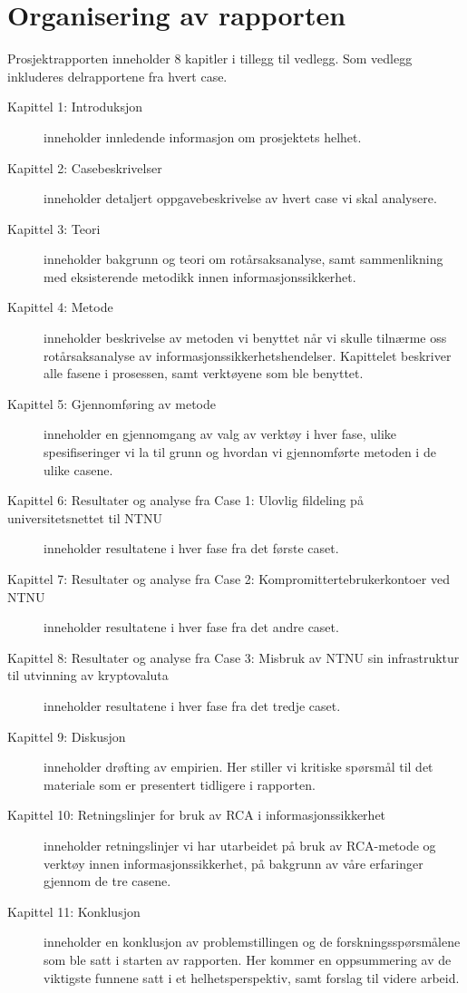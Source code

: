 \section{Organisering av rapporten}
\label{sec:organisering_rapport}
Prosjektrapporten inneholder 8 kapitler i tillegg til vedlegg. Som vedlegg inkluderes delrapportene fra hvert case. 


\begin{description}
    \item [Kapittel 1: Introduksjon] inneholder innledende informasjon om prosjektets helhet.
    
    \item [Kapittel 2: Casebeskrivelser] inneholder detaljert oppgavebeskrivelse av hvert case vi skal analysere.
    
    \item [Kapittel 3: Teori] inneholder bakgrunn og teori om rotårsaksanalyse, samt sammenlikning med eksisterende metodikk innen informasjonssikkerhet.
    
    \item [Kapittel 4: Metode] inneholder beskrivelse av metoden vi benyttet når vi skulle tilnærme oss rotårsaksanalyse av informasjonssikkerhetshendelser. Kapittelet beskriver alle fasene i prosessen, samt verktøyene som ble benyttet. 
    
    \item [Kapittel 5: Gjennomføring av metode] inneholder en gjennomgang av valg av verktøy i hver fase, ulike spesifiseringer vi la til grunn og hvordan vi gjennomførte metoden i de ulike casene. 
    
    \item [Kapittel 6: Resultater og analyse fra Case 1: Ulovlig fildeling på universitetsnettet til NTNU] inneholder resultatene i hver fase fra det første caset.
    
    \item [Kapittel 7: Resultater og analyse fra Case 2: Kompromittertebrukerkontoer ved NTNU] inneholder resultatene i hver fase fra det andre caset.
    
    \item [Kapittel 8: Resultater og analyse fra Case 3: Misbruk av NTNU sin infrastruktur til utvinning av kryptovaluta] inneholder resultatene i hver fase fra det tredje caset.
    
    \item [Kapittel 9: Diskusjon] inneholder drøfting av empirien. Her stiller vi kritiske spørsmål til det materiale som er presentert tidligere i rapporten. 
    
    \item [Kapittel 10: Retningslinjer for bruk av RCA i informasjonssikkerhet] inneholder retningslinjer vi har utarbeidet på bruk av RCA-metode og verktøy innen informasjonssikkerhet, på bakgrunn av våre erfaringer gjennom de tre casene. 
    
    \item [Kapittel 11: Konklusjon] inneholder en konklusjon av problemstillingen og de forskningsspørsmålene som ble satt i starten av rapporten. Her kommer en oppsummering av de viktigste funnene satt i et helhetsperspektiv, samt forslag til videre arbeid. 
\end{description}